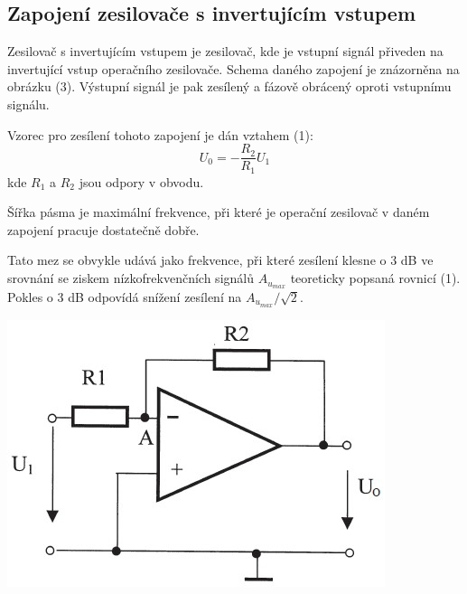 \documentclass[a4paper,11pt]{article}
\begin{document}
    \begin{minipage}[t]{0.5\textwidth} 
            \subsection{Zapojení zesilovače s invertujícím vstupem}
                Zesilovač s invertujícím vstupem je zesilovač, kde je vstupní signál přiveden na invertující vstup operačního zesilovače. Schema daného zapojení je znázorněna na obrázku (3). Výstupní signál je pak zesílený a fázově obrácený oproti vstupnímu signálu. 
                \par Vzorec pro zesílení tohoto zapojení je dán vztahem (1):
                \begin{equation}
                    U_0 = -\frac{R_2}{R_1} U_1
                \end{equation}
                kde $R_1$ a $R_2$ jsou odpory v obvodu. 
                \par Šířka pásma je maximální frekvence, při které je operační zesilovač v daném zapojení pracuje dostatečně dobře. 
                \par Tato mez se obvykle udává jako frekvence, při které zesílení klesne o 3 dB ve srovnání se ziskem nízkofrekvenčních signálů $A_{u_{max}}$ teoreticky popsaná rovnicí (1). Pokles o 3 dB odpovídá snížení zesílení na $A_{u_{max}}/\sqrt{2}$.

                \vspace{10pt}   
                \par \centering
                \includegraphics[scale=0.6]{inv_scheme}
                \captionsetup{justification=centering, font=footnotesize}
                \label{fig:inv_scheme}
                \vspace{10pt}
                \raggedright  


\end{minipage}
\end{document}
